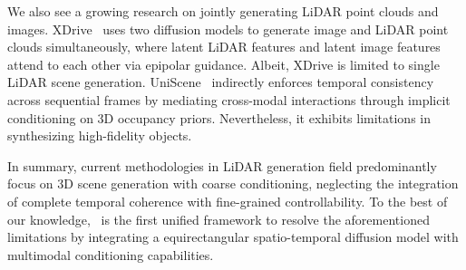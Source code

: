 We also see a growing research on jointly generating LiDAR point clouds and images. XDrive~\cite{xie2025xdrive} uses two diffusion models to generate image and LiDAR point clouds simultaneously, where latent LiDAR features and latent image features attend to each other via epipolar guidance. Albeit, XDrive \cite{xie2025xdrive} is limited to single LiDAR scene generation.
UniScene~\cite{li2024uniscene} indirectly enforces temporal consistency across sequential frames by mediating cross-modal interactions through implicit conditioning on 3D occupancy priors. Nevertheless, it exhibits limitations in synthesizing high-fidelity objects.


In summary, current methodologies in LiDAR generation field predominantly focus on 3D scene generation with coarse conditioning, neglecting the integration of complete temporal coherence with fine-grained controllability. To the best of our knowledge,  \sysname\ is the first unified framework to resolve the aforementioned limitations by integrating a equirectangular spatio-temporal diffusion model with multimodal conditioning capabilities.

